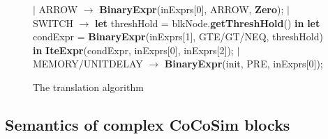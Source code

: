 \documentclass{article}
\begin{document}
\begin{figure}
\begin{algorithmic}
\State $\mid$ ARROW $\rightarrow$ \textbf{BinaryExpr}(inExprs[0], ARROW, \textbf{Zero});
\State $\mid$ SWITCH $\rightarrow$  \textbf{let} threshHold = blkNode.\textbf{getThreshHold}() \textbf{in}
\State {\ \ \ \ \ \ \ \ \ \ \ \ \ \ \ \ \ \ } \textbf{let} condExpr = \textbf{BinaryExpr}(inExprs[1], GTE/GT/NEQ, threshHold) \textbf{in}
\State {\ \ \ \ \ \ \ \ \ \ \ \ \ \ \ \ \ \ } \textbf{IteExpr}(condExpr, inExprs[0], inExprs[2]);
\State $\mid$ MEMORY/UNITDELAY $\rightarrow$ \textbf{BinaryExpr}(init, PRE, inExprs[0]);
\EndFunction
\end{algorithmic}
\label{block}
\caption{The translation algorithm}
\end{figure}

\subsection{Semantics of complex CoCoSim blocks}
\end{document}

